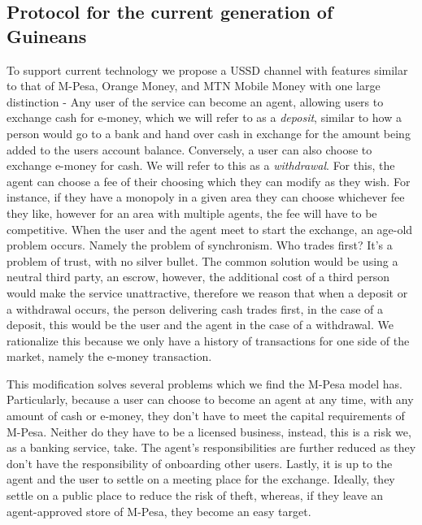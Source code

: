 \documentclass[11pt, a4paper]{article}
\begin{document}
\subsection{Protocol for the current generation of Guineans}
To support current technology we propose a USSD channel with features similar to that of M-Pesa, Orange Money, and MTN Mobile Money with one large distinction - Any user of the service can become an agent, allowing users to exchange cash for e-money, which we will refer to as a \textit{deposit}, similar to how a person would go to a bank and hand over cash in exchange for the amount being added to the users account balance. Conversely, a user can also choose to exchange e-money for cash. We will refer to this as a \textit{withdrawal}. For this, the agent can choose a fee of their choosing which they can modify as they wish. For instance, if they have a monopoly in a given area they can choose whichever fee they like, however for an area with multiple agents, the fee will have to be competitive. When the user and the agent meet to start the exchange, an age-old problem occurs. Namely the problem of synchronism. Who trades first? It's a problem of trust, with no silver bullet. The common solution would be using a neutral third party, an escrow, however, the additional cost of a third person would make the service unattractive, therefore we reason that when a deposit or a withdrawal occurs, the person delivering cash trades first, in the case of a deposit, this would be the user and the agent in the case of a withdrawal. We rationalize this because we only have a history of transactions for one side of the market, namely the e-money transaction.

This modification solves several problems which we find the M-Pesa model has. Particularly, because a user can choose to become an agent at any time, with any amount of cash or e-money, they don't have to meet the capital requirements of M-Pesa. Neither do they have to be a licensed business, instead, this is a risk we, as a banking service, take. The agent's responsibilities are further reduced as they don't have the responsibility of onboarding other users. Lastly, it is up to the agent and the user to settle on a meeting place for the exchange. Ideally, they settle on a public place to reduce the risk of theft, whereas, if they leave an agent-approved store of M-Pesa, they become an easy target.
\end{document}

